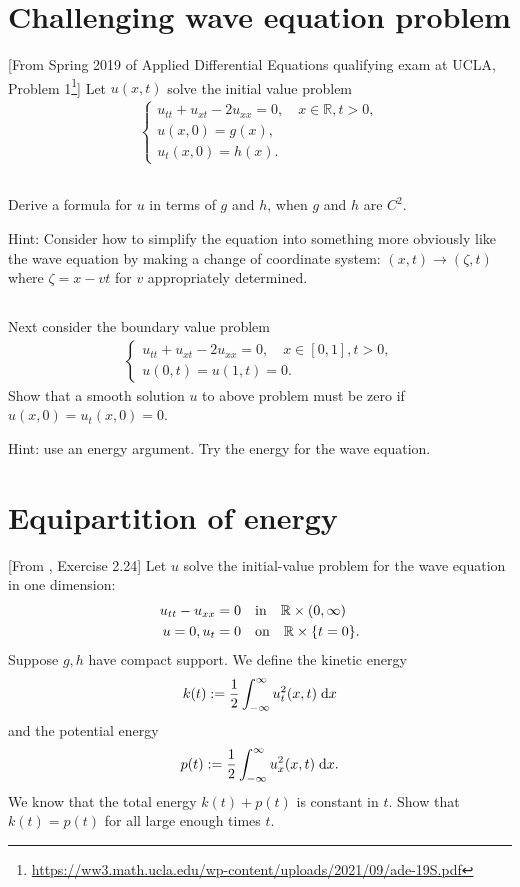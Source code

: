 \documentclass[11pt,letterpaper]{article}
\begin{document}
\section{Challenging wave equation problem}
[From Spring 2019 of Applied Differential Equations qualifying exam at UCLA, Problem 1\footnote{\url{https://ww3.math.ucla.edu/wp-content/uploads/2021/09/ade-19S.pdf}}]  Let $u(x,t)$ solve the initial value problem
\begin{align}
    \begin{cases}
        u_{tt}+u_{xt}-2u_{xx} = 0,\quad x\in\mathbb{R}, t>0,\\
        u(x,0) = g(x),\\
        u_t(x,0) = h(x).
    \end{cases}
\end{align}

\subsection{}
Derive a formula for $u$ in terms of $g$ and $h$, when $g$ and $h$ are $C^2$. 

Hint: Consider how to simplify the equation into something more obviously like the wave equation
by making a change of coordinate system: $(x,t)\to (\zeta,t)$ where $\zeta = x-vt$ for $v$ appropriately determined. 

\subsection{}
Next consider the boundary value problem 
\begin{align}
    \begin{cases}
        u_{tt}+u_{xt}-2u_{xx} = 0,\quad x\in[0,1], t>0,\\
        u(0,t) = u(1,t) = 0.
    \end{cases}
\end{align}
Show that a smooth solution $u$ to above problem must be zero if $u(x,0)=u_t(x,0)=0$. 

Hint: use an energy argument. Try the energy for the wave equation. 

\section{Equipartition of energy}
[From \cite{Evans_10}, Exercise 2.24] Let $u$ solve the initial-value problem for the wave equation in one dimension:
\begin{align}
    u_{tt}-u_{xx} = 0 &\quad \mbox{in} \quad \mathbb{R}\times(0,\infty)\\
    u=0, u_t=0 &\quad \mbox{on} \quad \mathbb{R}\times\{t=0\}.
\end{align}
Suppose $g,h$ have compact support. We define the kinetic energy
\begin{align}
    k(t):= \frac{1}{2}\int_{-\infty}^\infty u_t^2(x,t)\;\mathrm{d} x
\end{align}
and the potential energy
\begin{align}
    p(t):= \frac{1}{2}\int_{-\infty}^\infty u_x^2(x,t)\;\mathrm{d} x.
\end{align}
We know that the total energy $k(t)+p(t)$ is constant in $t$. Show that $k(t)=p(t)$ for all large enough times $t$. 

    
\vfill
\printbibliography
\end{document}
